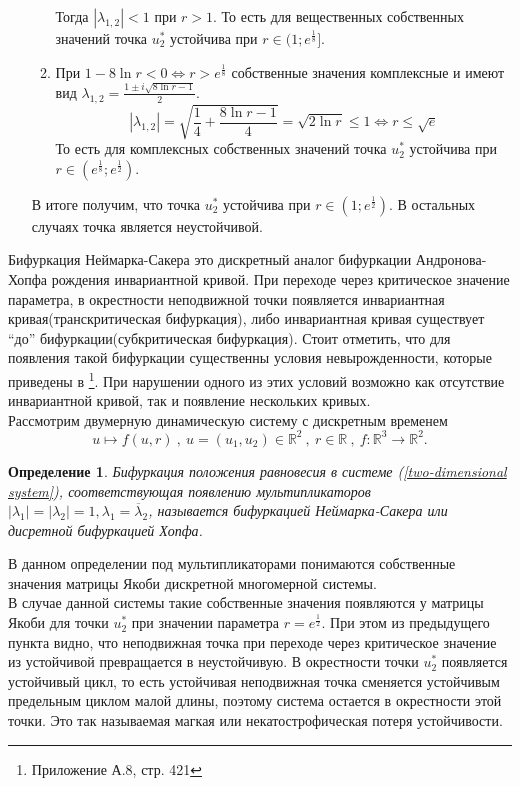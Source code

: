 \documentclass[10pt]{article}
\newtheorem{definition}{Определение}
\numberwithin{equation}{section}
\begin{document}
\begin{enumerate}
\begin{enumerate}
		Тогда \( |\lambda_{1,2} | < 1 \) при \( r > 1 \). То есть для вещественных собственных значений точка \( u_2^* \) устойчива при \( r \in (1;e^\frac{1}{8}] \).
		\item При \( 1 - 8 \ln r < 0 \iff r > e^\frac{1}{8} \) собственные значения комплексные и имеют вид \( \lambda_{1,2} = \frac{1 \pm i\sqrt{8 \ln r - 1}}{2} \).
		\[ | \lambda_{1,2} | = \sqrt{\frac{1}{4} + \frac{8 \ln r - 1}{4} } = \sqrt{2 \ln r } \le 1 \iff r \le \sqrt{e} \]
	То есть для комплексных собственных значений точка \( u_2^* \) устойчива при \( r \in (e^\frac{1}{8}; e^\frac{1}{2}) \). 
	\end{enumerate}
	В итоге получим, что точка \( u_2^* \) устойчива при \( r \in (1;e^\frac{1}{2} ) \). В остальных случаях точка является неустойчивой.
\end{enumerate}

	Бифуркация Неймарка-Сакера это дискретный аналог бифуркации Андронова-Хопфа рождения инвариантной кривой. При переходе через критическое значение параметра, в окрестности неподвижной точки появляется инвариантная кривая(транскритическая бифуркация), либо инвариантная кривая существует ``до'' бифуркации(субкритическая бифуркация). Стоит отметить, что для появления такой бифуркации существенны условия невырожденности, которые приведены в \cite{1} \footnote{Приложение А.8, стр. 421}. При нарушении одного из этих условий возможно как отсутствие инвариантной кривой, так и появление нескольких кривых. \medskip\\
	Рассмотрим двумерную динамическую систему с дискретным временем
	\begin{equation}\label{two-dimensional system}
		u \mapsto f(u,r) \ , \ u = (u_1, u_2) \in \mathbb{R}^2 \ , \ r \in \mathbb{R} \ , \ f : \mathbb{R}^3 \to \mathbb{R}^2 . 
	\end{equation}
	
\begin{definition}
	Бифуркация положения равновесия в системе (\ref{two-dimensional system}), соответствующая появлению мультипликаторов \( |\lambda_1| = |\lambda_2| = 1, \lambda_1 = \overline{\lambda}_2 \), называется бифуркацией Неймарка-Сакера или дисретной бифуркацией Хопфа.
\end{definition}
В данном определении под мультипликаторами понимаются собственные значения матрицы Якоби дискретной многомерной системы.\medskip\\
В случае данной системы такие собственные значения появляются у матрицы Якоби для точки \( u_2^* \) при значении параметра \( r = e^\frac{1}{2} \).
При этом из предыдущего пункта видно, что неподвижная точка при переходе через критическое значение из устойчивой превращается в неустойчивую. 
В окрестности точки \( u_2^* \) появляется устойчивый цикл, то есть устойчивая неподвижная точка сменяется устойчивым предельным циклом малой длины, поэтому система остается в окрестности этой точки. Это так называемая магкая или некатострофическая потеря устойчивости.
\end{document}
